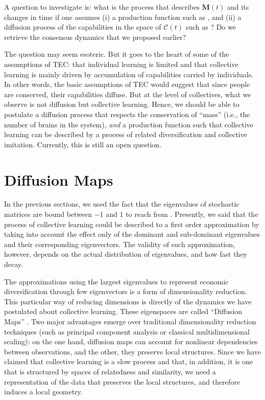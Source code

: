 \documentclass[12pt]{article}
\newcommand{\mtx}[1]{\mathbf{ #1}}
\begin{document}
A question to investigate is: what is the process that describes $\mtx{M}(t)$ and its changes in time if one assumes (i) a production function such as , and (ii) a diffusion process of the capabilities in the space of $\mtx{{\mathcal C}}(t)$ such as ? Do we retrieve the consensus dynamics that we proposed earlier?

The question may seem esoteric. But it goes to the heart of some of the assumptions of TEC: that individual learning is limited and that collective learning is mainly driven by accumulation of capabilities carried by individuals. In other words, the basic assumptions of TEC would suggest that since people are conserved, their capabilities diffuse. But at the level of collectives, what we observe is not diffusion but collective learning. Hence, we should be able to postulate a diffusion process that respects the conservation of ``mass'' (i.e., the number of brains in the system), \emph{and} a production function such that collective learning can be described by a process of related diversification and collective imitation. Currently, this is still an open question.



\section{Diffusion Maps}
In the previous sections, we used the fact that the eigenvalues of stochastic matrices are bound between $-1$ and $1$ to reach  from . Presently, we said that the process of collective learning could be described to a first order approximation by taking into account the effect only of the dominant and sub-dominant eigenvalues and their corresponding eigenvectors. The validity of such approximation, however, depends on the actual distribution of eigenvalues, and how fast they decay.

The approximations using the largest eigenvalues to represent economic diversification through few eigenvectors is a form of dimensionality reduction. This particular way of reducing dimensions is directly of the dynamics we have postulated about collective learning. These eigenspaces are called ``Diffusion Maps'' \citep{lafon_diffusion_2006,coifman_diffusion_2006}. Two major advantages emerge over traditional dimensionality reduction techniques (such as principal component analysis or classical multidimensional scaling): on the one hand, diffusion maps can account for nonlinear dependencies between observations, and the other, they preserve local structures. Since we have claimed that collective learning is a slow process and that, in addition, it is one that is structured by spaces of relatedness and similarity, we need a representation of the data that preserves the local structures, and therefore induces a local geometry. 
\end{document}
